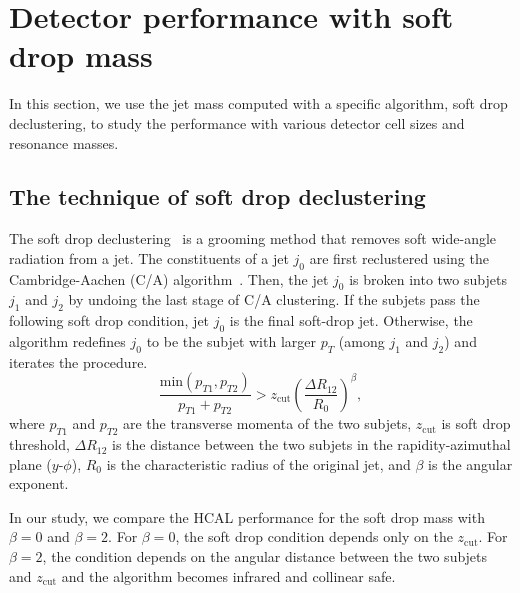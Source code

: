 \section{Detector performance with soft drop mass}

In this section, we use the jet mass computed with a specific algorithm, soft 
drop declustering, to study the performance with various detector 
cell sizes and resonance masses. 

\subsection{The technique of soft drop declustering}
The soft drop declustering~\cite{Larkoski:2014wba} is a grooming method 
that removes soft wide-angle radiation from a jet. The constituents of a jet 
$j_0$ are first reclustered using the Cambridge-Aachen
 (C/A) algorithm~\cite{Dokshitzer:1997in,Wobisch:1998wt}. Then, the jet $j_0$ 
is broken into two subjets $j_1$ and $j_2$ by undoing the last stage of C/A 
clustering.
If the subjets pass the following soft drop condition, jet $j_0$ is the final 
soft-drop jet. Otherwise, the algorithm redefines $j_0$ to be the subjet with 
larger $p_T$ (among $j_1$ and $j_2$) and iterates the procedure.
\begin{equation} \label{eq:soft-drop}
\frac{\mathrm{min}(p_{T1},p_{T2})}{p_{T1}+p_{T2}}>z_\mathrm{cut}(\frac{\Delta R_{12}}{R_{0}})^{\beta},
\end{equation}
where $p_{T1}$ and $p_{T2}$ are the transverse momenta of the two subjets, 
$z_\mathrm{cut}$ is soft drop threshold, 
$\Delta R_{12}$ is the distance between the two subjets in the 
rapidity-azimuthal plane ($y$-$\phi$), $R_0$ is the characteristic radius 
of the original jet, and $\beta$ is the angular exponent.

In our study, we compare the HCAL performance for  the soft drop mass with 
$\beta=0$  and $\beta=2$. For $\beta=0$, the soft drop condition 
depends only on the $z_\mathrm{cut}$. For $\beta=2$, the condition depends on 
the angular distance between the two subjets and $z_\mathrm{cut}$ and the 
algorithm becomes infrared and collinear safe. 

